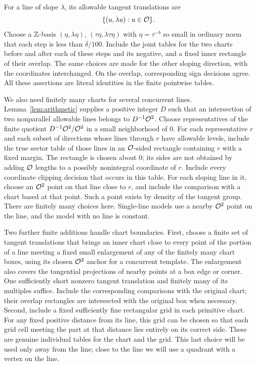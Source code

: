 For a line of slope $\lambda$, its allowable tangent translations are
\[
 \{(u,\lambda u):u\in\mathcal O\}.
\]
Choose a $\mathbb Z$-basis $(\eta,\lambda\eta)$,
$(\tau\eta,\lambda\tau\eta)$ with $\eta=\tau^{-b}$ so small in
ordinary norm that each step is less than $\delta/100$.  Include the
joint tables for the two charts before and after each of these steps
and its negative, and a fixed inner rectangle of their overlap.
The same choices are made for the other sloping direction, with the
coordinates interchanged.  On the overlap, corresponding sign
decisions agree.  All these assertions are literal identities in the
finite pointwise tables.

We also need finitely many charts for several concurrent lines.
Lemma~\ref{lem:arithmetic} supplies a positive integer $D$ such that an
intersection of two nonparallel allowable lines belongs to
$D^{-1}\mathcal O^2$.  Choose representatives of the finite quotient
$D^{-1}\mathcal O^2/\mathcal O^2$ in a small neighborhood of $0$.  For each
representative $r$ and each subset of directions whose lines through
$r$ have allowable levels, include the true sector table of those
lines in an $\mathcal O$-sided rectangle containing $r$ with a fixed margin.
The rectangle is chosen about $0$; its sides are not obtained by adding
$\mathcal O$ lengths to a possibly nonintegral coordinate of $r$.
Include every coordinate clipping decision that occurs in this table.
For each sloping line in it, choose an $\mathcal O^2$ point on that line close
to $r$, and include the comparison with a chart based at that point.
Such a point exists by density of the tangent group.  There are finitely
many choices here.  Single-line models use a nearby $\mathcal O^2$ point on
the line, and the model with no line is constant.

Two further finite additions handle chart boundaries.  First, choose a
finite set of tangent translations that brings an inner chart close to
every point of the portion of a line meeting a fixed small enlargement
of any of the finitely many chart boxes, using its chosen $\mathcal O^2$
anchor for a concurrent template.  The enlargement also covers the
tangential projections of nearby points at a box edge or corner.
One sufficiently short nonzero tangent translation and finitely many
of its multiples suffice.  Include the corresponding comparisons with
the original chart; their overlap rectangles are intersected with the
original box when necessary.  Second, include a fixed sufficiently
fine rectangular grid in each primitive chart.  For any fixed positive
distance from its line, this grid can be chosen so that each grid cell
meeting the part at that distance lies entirely on its correct side.
These are genuine individual tables for the chart and the grid.
This last choice will be used only away from the line; close to the
line we will use a quadrant with a vertex on the line.

